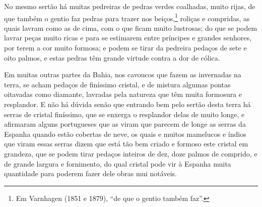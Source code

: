 \begin{linenumbers}
No mesmo sertão há muitas pedreiras de pedras verdes coalhadas, muito rijas, de que também
o gentio faz pedras para trazer nos beiços,\footnote{ Em Varnhagen (1851 e 1879), ``de que
o gentio também faz''.} roliças e compridas, as quais lavram como as de cima, com o que
ficam muito lustrosas; do que se podem lavrar peças muito ricas e para se estimarem entre
príncipes e grandes senhores, por terem a cor muito formosa; e podem se tirar da pedreira
pedaços de sete e oito palmos, e estas pedras têm grande virtude contra a dor de cólica.

Em muitas outras partes da Bahia, nos cavoucos que fazem as invernadas na terra, se acham
pedaços de finíssimo cristal, e de mistura algumas pontas oitavadas como diamante,
lavradas pela natureza que têm muita formosura e resplandor. E não há dúvida senão que
entrando bem pelo sertão desta terra há serras de cristal finíssimo, que se enxerga o
resplandor delas de muito longe, e afirmaram alguns portugueses que as viram que parecem
de longe as serras da Espanha quando estão cobertas de neve, os quais e muitos mamelucos e
índios que viram essas serras dizem que está tão bem criado e formoso este cristal em
grandeza, que se podem tirar pedaços inteiros de dez, doze palmos de comprido, e de grande
largura e fornimento, do qual cristal pode vir à Espanha muita quantidade para poderem
fazer dele obras mui notáveis.


\end{linenumbers}
